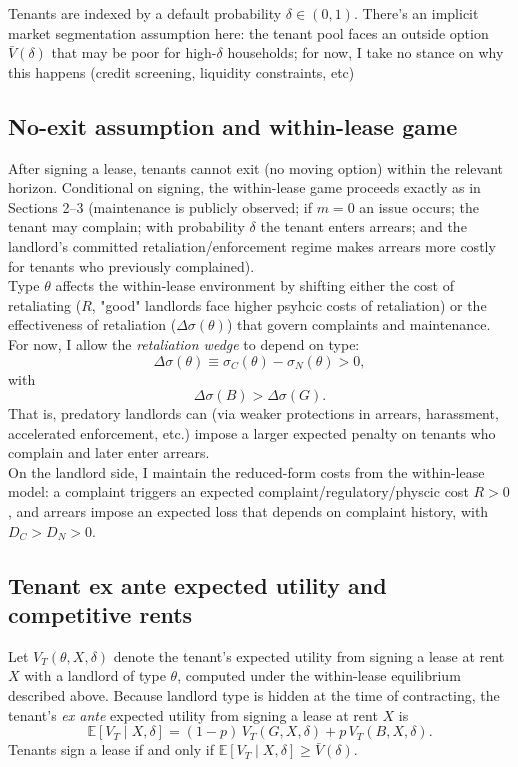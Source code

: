 \documentclass[11pt]{article}
\begin{document}
Tenants are indexed by a default probability $\delta \in (0,1)$. There's an implicit market segmentation assumption here: the tenant pool faces an outside option $\bar V(\delta)$ that may be poor for high-$\delta$ households; for now, I take no stance on why this happens (credit screening, liquidity constraints, etc)

\subsection{No-exit assumption and within-lease game}

After signing a lease, tenants cannot exit (no moving option) within the relevant horizon. Conditional on signing, the within-lease game proceeds exactly as in Sections 2--3 (maintenance is publicly observed; if $m=0$ an issue occurs; the tenant may complain; with probability $\delta$ the tenant enters arrears; and the landlord's committed retaliation/enforcement regime makes arrears more costly for tenants who previously complained). \\

Type $\theta$ affects the within-lease environment by shifting either the cost of retaliating ($R$, "good" landlords face higher psyhcic costs of retaliation) or the effectiveness of retaliation ($\Delta\sigma(\theta)$) that govern complaints and maintenance. For now, I allow the \emph{retaliation wedge} to depend on type:
\[
\Delta\sigma(\theta) \equiv \sigma_C(\theta) - \sigma_N(\theta) > 0,
\]
with
\[
\Delta\sigma(B) > \Delta\sigma(G).
\]
That is, predatory landlords can (via weaker protections in arrears, harassment, accelerated enforcement, etc.) impose a larger expected penalty on tenants who complain and later enter arrears.\\

On the landlord side, I maintain the reduced-form costs from the within-lease model: a complaint triggers an expected complaint/regulatory/physcic cost $R>0$, and arrears impose an expected loss that depends on complaint history, with $D_C>D_N>0$.

\subsection{Tenant ex ante expected utility and competitive rents}

Let $V_T(\theta,X,\delta)$ denote the tenant's expected utility from signing a lease at rent $X$ with a landlord of type $\theta$, computed under the within-lease equilibrium described above. Because landlord type is hidden at the time of contracting, the tenant's \emph{ex ante} expected utility from signing a lease at rent $X$ is
\begin{equation}
\mathbb{E}\left[V_T \mid X,\delta\right]
= (1-p)\,V_T(G,X,\delta) + p\,V_T(B,X,\delta).
\label{eq:exanteV}
\end{equation}
Tenants sign a lease if and only if $\mathbb{E}[V_T\mid X,\delta] \ge \bar V(\delta)$.
\end{document}
